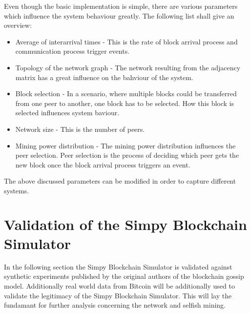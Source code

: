 Even though the basic implementation is simple, there are various parameters which influence the system behaviour greatly. The following list shall give an overview:
\begin{itemize}
\item Average of interarrival times - This is the rate of block arrival process and communication process trigger events. 
\item Topology of the network graph - The network resulting from the adjacency matrix has a great influence on the bahviour of the system.
\item Block selection - In a scenario, where multiple blocks could be transferred from one peer to another, one block has to be selected. How this block is selected influences system baviour.
\item Network size - This is the number of peers.
\item Mining power distribution - The mining power distribution influences the peer selection. Peer selection is the process of deciding which peer gets the new block once the block arrival process triggers an event.
\end{itemize}
The above discussed parameters can be modified in order to capture different systems.

\section{Validation of the Simpy Blockchain Simulator}
In the following section the Simpy Blockchain Simulator is validated against synthetic experiments published by the original authors of the blockchain gossip model. Additionally real world data from Bitcoin will be additionally used to validate the legitimacy of the Simpy Blockchain Simulator. This will lay the fundamant for further analysis concerning the network and selfish mining. 
